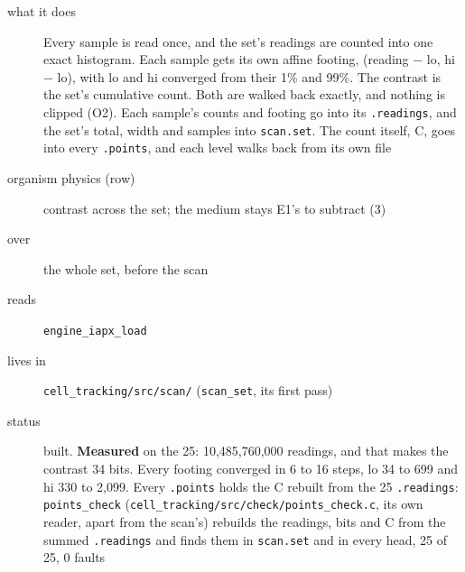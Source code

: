 \begin{description}
\item[{what it does}] Every sample is read once, and the set's readings are counted into one exact histogram. Each sample gets its own affine footing, (reading − lo, hi − lo), with lo and hi converged from their 1\% and 99\%. The contrast is the set's cumulative count. Both are walked back exactly, and nothing is clipped (O2). Each sample's counts and footing go into its \texttt{.\allowbreak{}readings}, and the set's total, width and samples into \texttt{scan.\allowbreak{}set}. The count itself, C, goes into every \texttt{.\allowbreak{}points}, and each level walks back from its own file
\item[{organism physics (row)}] contrast across the set; the medium stays E1's to subtract (3)
\item[{over}] the whole set, before the scan
\item[{reads}] \texttt{engine\_\allowbreak{}iapx\_\allowbreak{}load}
\item[{lives in}] \texttt{cell\_\allowbreak{}tracking/\allowbreak{}src/\allowbreak{}scan/\allowbreak{}} (\texttt{scan\_\allowbreak{}set}, its first pass)
\item[{status}] built. \textbf{Measured} on the 25: 10,485,760,000 readings, and that makes the contrast 34 bits. Every footing converged in 6 to 16 steps, lo 34 to 699 and hi 330 to 2,099. Every \texttt{.\allowbreak{}points} holds the C rebuilt from the 25 \texttt{.\allowbreak{}readings}: \texttt{points\_\allowbreak{}check} (\texttt{cell\_\allowbreak{}tracking/\allowbreak{}src/\allowbreak{}check/\allowbreak{}points\_\allowbreak{}check.\allowbreak{}c}, its own reader, apart from the scan's) rebuilds the readings, bits and C from the summed \texttt{.\allowbreak{}readings} and finds them in \texttt{scan.\allowbreak{}set} and in every head, 25 of 25, 0 faults
\end{description}

